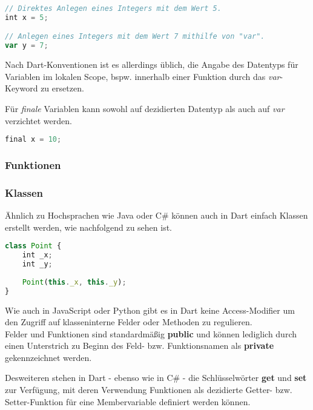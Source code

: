 \begin{lstlisting}[language=JavaScript]
// Direktes Anlegen eines Integers mit dem Wert 5.
int x = 5;

// Anlegen eines Integers mit dem Wert 7 mithilfe von "var".
var y = 7;
\end{lstlisting}

Nach Dart-Konventionen ist es allerdings üblich, die Angabe des Datentyps für Variablen 
im lokalen Scope, bspw. innerhalb einer Funktion durch das \textit{var}-Keyword zu ersetzen.

Für \textit{finale} Variablen kann sowohl auf dezidierten Datentyp als auch auf \textit{var} 
verzichtet werden.

\begin{lstlisting}[language=JavaScript]
final x = 10;
\end{lstlisting}

\subsubsection{Funktionen}



\subsubsection{Klassen}

Ähnlich zu Hochsprachen wie Java oder C\# können auch in Dart einfach Klassen
erstellt werden, wie nachfolgend zu sehen ist.

\pagebreak

\begin{lstlisting}[language=JavaScript]
class Point {
    int _x;
    int _y;
    
    Point(this._x, this._y);
}
\end{lstlisting}

Wie auch in JavaScript oder Python gibt es in Dart keine Access-Modifier um den Zugriff
auf klasseninterne Felder oder Methoden zu regulieren.\\
Felder und Funktionen sind standardmäßig \textbf{public} und können lediglich durch
einen Unterstrich zu Beginn des Feld- bzw. Funktionsnamen als \textbf{private} gekennzeichnet
werden.

Desweiteren stehen in Dart - ebenso wie in C\# - die Schlüsselwörter \textbf{get} und 
\textbf{set} zur Verfügung, mit deren Verwendung Funktionen als dezidierte Getter- bzw.
Setter-Funktion für eine Membervariable definiert werden können.


